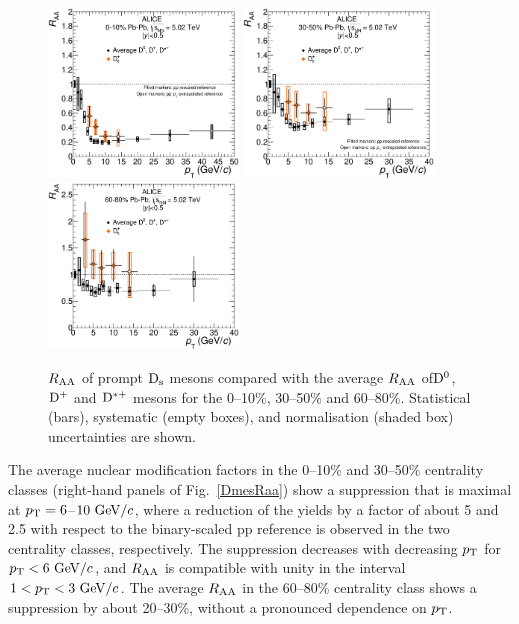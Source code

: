 \begin{figure}[!h]
\centering
\includegraphics[angle=0, width=0.45\textwidth]{FigCap5/DmesonAverageDs_010_.eps}
\includegraphics[angle=0, width=0.45\textwidth]{FigCap5/DmesonAverageDs_3050_.eps}
\includegraphics[angle=0, width=0.45\textwidth]{FigCap5/DmesonAverageDs_6080_.eps}
 \caption{$R_{\rm AA}$ 
  of prompt ${\rm D_s}$ mesons 
  compared with the average $R_{\rm AA}$ of${\rm D^0}$, ${\rm D^+}$ and ${\rm D^{*+}}$ mesons for the 
0--10\%, 30--50\% and 60--80\%. 
Statistical (bars),  systematic (empty boxes), and normalisation (shaded box) 
uncertainties are shown.}
 \label{fig:DmesRaa} 
\end{figure} 

\fi

The average nuclear modification factors in the 0--10\% and 30--50\% centrality classes (right-hand panels of Fig.~\ref{DmesRaa}) show a suppression that is
maximal at $p_{\rm T}=6$--$10~\mathrm{GeV}/c$, where a reduction of the yields by
a factor of about 5 and 2.5 with respect to the binary-scaled pp reference is observed in the two centrality classes, respectively.
The suppression decreases with decreasing $p_{\rm T}$ for $p_{\rm T}<6~\mathrm{GeV}/c$, and 
$R_{\rm AA}$ is compatible with unity  in the interval $1<p_{\rm T}<3~\mathrm{GeV}/c$.
The average $R_{\rm AA}$ in the 60--80\% centrality class shows a suppression by about 20--30\%, without a pronounced dependence on $p_{\rm T}$.


